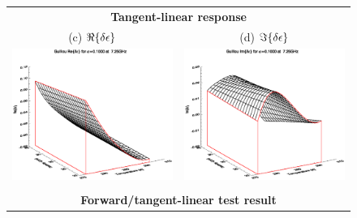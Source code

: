 \begin{figure}[htp]
\begin{tabular}{c c}
    \multicolumn{2}{c}{\sffamily\textbf{Tangent-linear response}}\\
    \textsf{(c)} $\Re\{\delta\epsilon\}$ &
    \textsf{(d)} $\Im\{\delta\epsilon\}$ \\
    \hspace{1.0em}\includegraphics[bb=125 240 508 540,clip,scale=0.5]{graphics/Guillou/FWDTL/TLde_a0.1000_re_7.25GHz.eps} &
    \includegraphics[bb=125 240 508 540,clip,scale=0.5]{graphics/Guillou/FWDTL/TLde_a0.1000_im_7.25GHz.eps} \\\\
    \multicolumn{2}{c}{\sffamily\textbf{Forward/tangent-linear test result}}\\

\end{tabular}
\end{figure}
